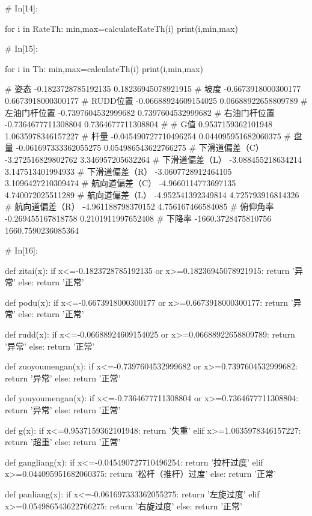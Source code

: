 \documentclass{MathorCupModeling}
\begin{document}
\begin{python}
# In[14]:


for i in RateTh:
    min,max=calculateRateTh(i)
    print(i,min,max)


# In[15]:


for i in Th:
    min,max=calculateTh(i)
    print(i,min,max)


# 姿态 -0.1823728785192135 0.18236945078921915
# 坡度 -0.6673918000300177 0.6673918000300177
# RUDD位置 -0.06688924609154025 0.06688922658809789
# 左油门杆位置 -0.7397604532999682 0.7397604532999682
# 右油门杆位置 -0.7364677711308804 0.7364677711308804
# 
# G值 0.9537159362101948 1.0635978346157227
# 杆量 -0.045490727710496254 0.044095951682060375
# 盘量 -0.061697333362055275 0.054986543622766275
# 下滑道偏差（C） -3.272516829802762 3.346957205632264
# 下滑道偏差（L） -3.088455218634214 3.147513401994933
# 下滑道偏差（R） -3.0607728912464105 3.1096427210309474
# 航向道偏差（C） -4.9660114773697135 4.740072025511289
# 航向道偏差（L） -4.952541392349814 4.725793916814326
# 航向道偏差（R） -4.961188798370152 4.756167466584085
# 俯仰角率 -0.269455167818758 0.2101911997652408
# 下降率 -1660.3728475810756 1660.7590236085364

# In[16]:


def zitai(x):
    if x<=-0.1823728785192135 or x>=0.18236945078921915:
        return '异常'
    else:
        return '正常'


def podu(x):
    if x<=-0.6673918000300177 or x>=0.6673918000300177:
        return '异常'
    else:
        return '正常'


def rudd(x):
    if x<=-0.06688924609154025 or x>=0.06688922658809789:
        return '异常'
    else:
        return '正常'


def zuoyoumengan(x):
    if x<=-0.7397604532999682 or x>=0.7397604532999682:
        return '异常'
    else:
        return '正常'


def youyoumengan(x):
    if x<=-0.7364677711308804 or x>=0.7364677711308804:
        return '异常'
    else:
        return '正常'


def g(x):
    if x<=0.9537159362101948:
        return '失重'
    elif x>=1.0635978346157227:
        return '超重'
    else:
        return '正常'


def gangliang(x):
    if x<=-0.045490727710496254:
        return '拉杆过度'
    elif x>=0.044095951682060375:
        return '松杆（推杆）过度'
    else:
        return '正常'


def panliang(x):
    if x<=-0.061697333362055275:
        return '左旋过度'
    elif x>=0.054986543622766275:
        return '右旋过度'
    else:
        return '正常'



\end{python}
\end{document}
